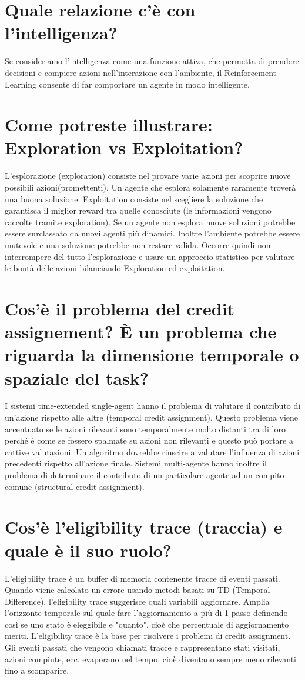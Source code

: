\documentclass[\main/main.tex]{subfiles}
\begin{document}
\section{Quale relazione c'è con l'intelligenza?}
Se consideriamo l’intelligenza come una funzione attiva, che permetta di prendere decisioni e compiere azioni nell’interazione con l’ambiente, il Reinforcement Learning consente di far comportare un agente in modo intelligente.

\section{Come potreste illustrare: Exploration vs Exploitation?}
L'esplorazione (exploration) consiste nel provare varie azioni per scoprire nuove possibili azioni(promettenti).
Un agente che esplora solamente raramente troverà una buona soluzione.
Exploitation consiste nel scegliere la soluzione che garantisca il miglior reward tra quelle conosciute (le informazioni vengono raccolte tramite exploration).
Se un agente non esplora nuove soluzioni potrebbe essere surclassato da nuovi agenti più dinamici. Inoltre l'ambiente potrebbe essere mutevole e una soluzione potrebbe non restare valida. Occorre quindi non interrompere del tutto l'esplorazione e usare un approccio statistico per valutare le bontà delle azioni bilanciando Exploration ed exploitation.


\section{Cos'è il problema del credit assignement? È un problema che riguarda la dimensione temporale o spaziale del task?}
I sistemi time-extended single-agent hanno il problema di valutare il contributo di un'azione rispetto alle altre (temporal credit assignment).
Questo problema viene accentuato se le azioni rilevanti sono temporalmente molto distanti tra di loro perché è come se fossero spalmate su azioni non rilevanti e questo può portare a cattive valutazioni. Un algoritmo dovrebbe riuscire a valutare l'influenza di azioni precedenti rispetto all'azione finale.
Sistemi multi-agente hanno inoltre il problema di determinare il contributo di un particolare agente ad un compito comune (structural credit assignment).

\section{Cos'è l'eligibility trace (traccia) e quale è il suo ruolo?}
L'eligibility trace è un buffer di memoria contenente tracce di eventi passati.
Quando viene calcolato un errore usando metodi basati su TD (Temporal Difference), l'eligibility trace suggerisce quali variabili aggiornare.
Amplia l’orizzonte temporale sul quale fare l’aggiornamento a più di 1 passo definendo così se uno stato è eleggibile e "quanto", cioè che percentuale di aggiornamento meriti. 
L'eligibility trace è la base per risolvere i problemi di credit assignment.
Gli eventi passati che vengono chiamati tracce e rappresentano stati visitati, azioni compiute, ecc. evaporano nel tempo, cioè diventano sempre meno rilevanti fino a scomparire.
\end{document}
